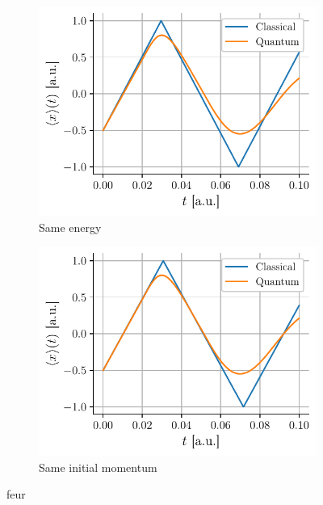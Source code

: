 \begin{figure}[h]
    \centering
    \begin{subfigure}{0.48\linewidth}
        \centering
        \includegraphics[width=\linewidth]{figures/i_classical_vs_quantum_energy.pdf}
        \caption{Same energy}
        \label{fig:i_classical_vs_quantum_energy}
    \end{subfigure}
    \begin{subfigure}{0.48\linewidth}
        \centering
        \includegraphics[width=\linewidth]{figures/i_classical_vs_quantum_momentum.pdf}
        \caption{Same initial momentum}
        \label{fig:i_classical_vs_quantum_momentum}
    \end{subfigure}
    \caption{feur}
    \label{fig:i_classical_vs_quantum}
\end{figure}

